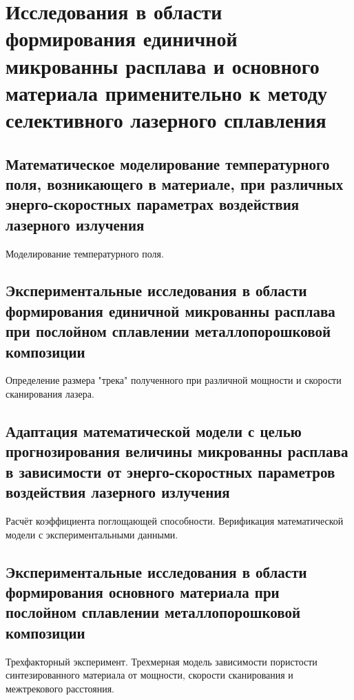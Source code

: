 \chapter{Исследования в области формирования единичной микрованны расплава и основного материала применительно к методу селективного лазерного сплавления}\label{ch:chapter4}

\section{Математическое моделирование температурного поля, возникающего в материале, при различных энерго-скоростных параметрах воздействия лазерного излучения}\label{sec:chapter4/section1}

Моделирование температурного поля. 

\section{Экспериментальные исследования в области формирования единичной микрованны расплава при послойном сплавлении металлопорошковой композиции}\label{sec:chapter4/section2}

Определение размера "трека" полученного при различной мощности и скорости сканирования лазера.

\section{Адаптация математической модели с целью прогнозирования величины микрованны расплава в зависимости от энерго-скоростных параметров воздействия лазерного излучения}\label{sec:chapter4/section3}

Расчёт коэффициента поглощающей способности. Верификация математической модели с экспериментальными данными.

\section{Экспериментальные исследования в области формирования основного материала при послойном сплавлении металлопорошковой композиции}\label{sec:chapter4/section4}

Трехфакторный эксперимент. Трехмерная модель зависимости пористости синтезированного материала от мощности, скорости сканирования и межтрекового расстояния.
